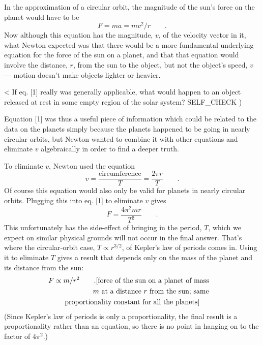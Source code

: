 In the approximation of a circular orbit, the magnitude of
the sun's force on the planet would have to be
\begin{equation}
    F=   ma=      mv^2/r \qquad .
\end{equation}
Now although this equation has the magnitude, $v$, of the
velocity vector in it, what Newton expected was that there
would be a more fundamental underlying equation for the
force of the sun on a planet, and that that equation would
involve the distance, $r$, from the sun to the object, but
not the object's speed, $v$ --- motion doesn't make
objects lighter or heavier.

<%
If eq. [1] really was generally applicable, what would
happen to an object released at rest in some empty region
of the solar system?
  SELF_CHECK
  ) %

Equation [1] was thus a useful piece of information which
could be related to the data on the planets simply because
the planets happened to be going in nearly circular orbits,
but Newton wanted to combine it with other equations and
eliminate $v$ algebraically in order to find a deeper truth.

To eliminate $v$, Newton used the equation
\begin{equation}
        v    =   \frac{\text{circumference}}{T} =    \frac{2\pi r}{T}   \qquad .
\end{equation}
Of course this equation would also only be valid for planets
in nearly circular orbits. Plugging this into eq. [1]
to eliminate $v$ gives
\begin{equation}
        F     =  \frac{4\pi^2mr}{T^2}     \qquad   .    
\end{equation}
This unfortunately has the side-effect of bringing in the
period, $T$, which we expect on similar physical grounds
will not occur in the final answer. That's where the
circular-orbit case, $T \propto r^{3/2}$,  of Kepler's law of periods comes in. Using
it to eliminate $T$ gives a result that depends only on the
mass of the planet and its distance from the sun:
\begin{multline*}
    F\propto m/r^2   \qquad   . \hfill \shoveright{\text{[force of the sun on a planet of mass}}\\
                                       \shoveright{\text{$m$ at a distance $r$ from the sun; same}}\\
                                       \text{proportionality constant for all the planets]}
\end{multline*}
(Since Kepler's law of periods is only a proportionality,
the final result is a proportionality rather than an
equation, so there is no point in hanging on to the
factor of $4\pi ^2$.)

